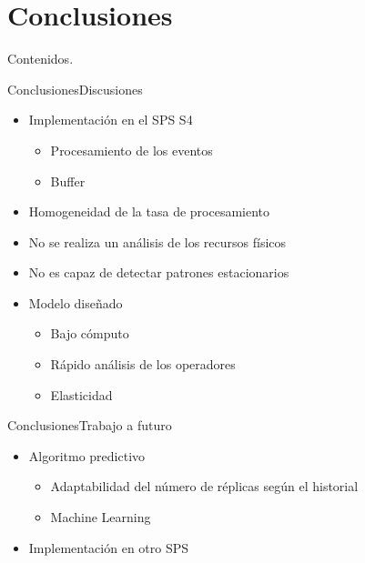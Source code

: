 \section{Conclusiones}

\addtocounter{framenumber}{-1}
\begin{frame}[t]{Contenidos}{\textcolor{UniBlue}{.}}
	\tableofcontents[currentsection]
\end{frame}

\begin{frame}{Conclusiones}{Discusiones}

\begin{itemize}
\item Implementación en el SPS S4
\begin{itemize}
	\item Procesamiento de los eventos
	\item Buffer
\end{itemize}
\item Homogeneidad de la tasa de procesamiento
\item No se realiza un análisis de los recursos físicos
\item No es capaz de detectar patrones estacionarios
\item Modelo diseñado
	\begin{itemize}
		\item Bajo cómputo
		\item Rápido análisis de los operadores
		\item Elasticidad
	\end{itemize}
\end{itemize}

\end{frame}

\begin{frame}{Conclusiones}{Trabajo a futuro}

\begin{itemize}
\item Algoritmo predictivo
\begin{itemize}
	\item Adaptabilidad del número de réplicas según el historial
	\item Machine Learning
\end{itemize}
\item Implementación en otro SPS
\end{itemize}

\end{frame}